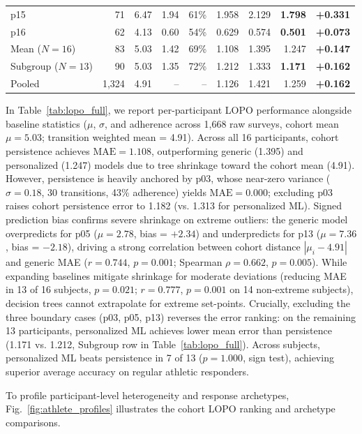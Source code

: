 \documentclass[runningheads]{llncs}
\begin{document}
\begin{table}[H]
\begin{tabular*}{\linewidth}{@{\extracolsep{\fill}}lrrrrrrrr}
p15 & 71 & 6.47 & 1.94 & 61\% & 1.958 & 2.129 & \textbf{1.798} & \textbf{+0.331}\\
p16 & 62 & 4.13 & 0.60 & 54\% & 0.629 & 0.574 & \textbf{0.501} & \textbf{+0.073}\\
\midrule
Mean ($N=16$) & 83 & 5.03 & 1.42 & 69\% & 1.108 & 1.395 & 1.247 & \textbf{+0.147}\\
Subgroup ($N=13$) & 90 & 5.03 & 1.35 & 72\% & 1.212 & 1.333 & \textbf{1.171} & \textbf{+0.162}\\
Pooled & 1,324 & 4.91 & -- & -- & 1.126 & 1.421 & 1.259 & \textbf{+0.162}\\
\bottomrule
\end{tabular*}\endgroup
\end{table}

In Table~\ref{tab:lopo_full}, we report per-participant LOPO performance alongside baseline statistics ($\mu$, $\sigma$, and adherence across 1,668 raw surveys, cohort mean $\mu = 5.03$; transition weighted mean = 4.91). Across all 16 participants, cohort persistence achieves $\text{MAE} = 1.108$, outperforming generic (1.395) and personalized (1.247) models due to tree shrinkage toward the cohort mean (4.91). However, persistence is heavily anchored by p03, whose near-zero variance ($\sigma = 0.18$, 30 transitions, 43\% adherence) yields $\text{MAE} = 0.000$; excluding p03 raises cohort persistence error to 1.182 (vs. 1.313 for personalized ML). Signed prediction bias confirms severe shrinkage on extreme outliers: the generic model overpredicts for p05 ($\mu = 2.78$, bias = $+2.34$) and underpredicts for p13 ($\mu = 7.36$, bias = $-2.18$), driving a strong correlation between cohort distance $|\mu_i - 4.91|$ and generic MAE ($r = 0.744$, $p = 0.001$; Spearman $\rho = 0.662$, $p = 0.005$). While expanding baselines mitigate shrinkage for moderate deviations (reducing MAE in 13 of 16 subjects, $p = 0.021$; $r = 0.777$, $p = 0.001$ on 14 non-extreme subjects), decision trees cannot extrapolate for extreme set-points. Crucially, excluding the three boundary cases (p03, p05, p13) reverses the error ranking: on the remaining 13 participants, personalized ML achieves lower mean error than persistence (1.171 vs. 1.212, Subgroup row in Table~\ref{tab:lopo_full}). Across subjects, personalized ML beats persistence in 7 of 13 ($p = 1.000$, sign test), achieving superior average accuracy on regular athletic responders.

To profile participant-level heterogeneity and response archetypes, Fig.~\ref{fig:athlete_profiles} illustrates the cohort LOPO ranking and archetype comparisons.
\end{document}
